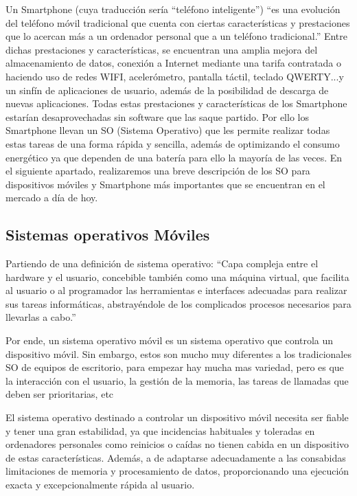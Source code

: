 \documentclass[../pfc.tex]{subfiles}
\begin{document}
	Un Smartphone (cuya traducción sería “teléfono inteligente”) “es una evolución del teléfono móvil tradicional que cuenta con ciertas características y prestaciones que lo acercan más a un ordenador personal que a un teléfono tradicional.”
	Entre dichas prestaciones y características, se encuentran una amplia mejora del almacenamiento de datos, conexión a Internet mediante una tarifa contratada o haciendo uso de redes WIFI, acelerómetro, pantalla táctil, teclado QWERTY...y un sinfín de aplicaciones de usuario, además de la posibilidad de descarga de nuevas aplicaciones.
	Todas estas prestaciones y características de los Smartphone estarían desaprovechadas sin software que las saque partido. Por ello los Smartphone llevan un SO (Sistema Operativo) que les permite realizar todas estas tareas de una forma rápida y sencilla, además de optimizando el consumo energético ya que dependen de una batería para ello la mayoría de las veces. 
	En el siguiente apartado, realizaremos una breve descripción de los SO para dispositivos móviles y Smartphone más importantes que se encuentran en el mercado a día de hoy.
	
	\subsection{Sistemas operativos Móviles}
	Partiendo de una definición de sistema operativo: “Capa compleja entre el hardware y el usuario, concebible también como una máquina virtual, que facilita al usuario o al programador las herramientas e interfaces adecuadas para realizar sus tareas informáticas, abstrayéndole de los complicados procesos necesarios para llevarlas a cabo.”
	
	Por ende, un sistema operativo móvil es un sistema operativo que controla un dispositivo móvil. Sin embargo, estos son mucho muy diferentes a los tradicionales SO de equipos de escritorio, para empezar hay mucha mas variedad, pero es que la interacción con el usuario, la gestión de la memoria, las tareas de llamadas que deben ser prioritarias, etc
	
	El sistema operativo destinado a controlar un dispositivo móvil necesita ser fiable y tener una gran estabilidad, ya que incidencias habituales y toleradas en ordenadores personales como reinicios o caídas no tienen cabida en un dispositivo de estas características. Además, a de adaptarse adecuadamente a las consabidas limitaciones de memoria y procesamiento de datos, proporcionando una ejecución exacta y excepcionalmente rápida al usuario.
	
\end{document}
